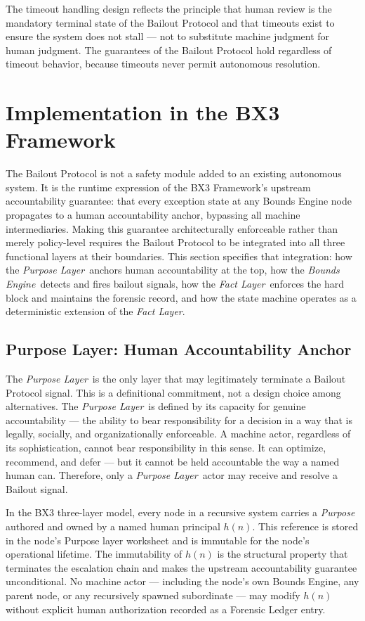 \documentclass[12pt]{article}
\newcommand{\purpose}{\textit{Purpose Layer}}
\newcommand{\bounds}{\textit{Bounds Engine}}
\newcommand{\fact}{\textit{Fact Layer}}
\begin{document}
The timeout handling design reflects the principle that human review is the mandatory terminal state of the Bailout Protocol and that timeouts exist to ensure the system does not stall --- not to substitute machine judgment for human judgment. The guarantees of the Bailout Protocol hold regardless of timeout behavior, because timeouts never permit autonomous resolution.


\section{Implementation in the BX3 Framework}
\label{sec:bailout-implementation}

The Bailout Protocol is not a safety module added to an existing autonomous system. It is the runtime expression of the BX3 Framework's upstream accountability guarantee: that every exception state at any Bounds Engine node propagates to a human accountability anchor, bypassing all machine intermediaries. Making this guarantee architecturally enforceable rather than merely policy-level requires the Bailout Protocol to be integrated into all three functional layers at their boundaries. This section specifies that integration: how the \purpose\ anchors human accountability at the top, how the \bounds\ detects and fires bailout signals, how the \fact\ enforces the hard block and maintains the forensic record, and how the state machine operates as a deterministic extension of the \fact.

\subsection{Purpose Layer: Human Accountability Anchor}
\label{sec:purpose-anchor}

The \purpose\ is the only layer that may legitimately terminate a Bailout Protocol signal. This is a definitional commitment, not a design choice among alternatives. The \purpose\ is defined by its capacity for genuine accountability --- the ability to bear responsibility for a decision in a way that is legally, socially, and organizationally enforceable. A machine actor, regardless of its sophistication, cannot bear responsibility in this sense. It can optimize, recommend, and defer --- but it cannot be held accountable the way a named human can. Therefore, only a \purpose\ actor may receive and resolve a Bailout signal.

In the BX3 three-layer model, every node in a recursive system carries a \textit{Purpose} authored and owned by a named human principal $h(n)$. This reference is stored in the node's Purpose layer worksheet and is immutable for the node's operational lifetime. The immutability of $h(n)$ is the structural property that terminates the escalation chain and makes the upstream accountability guarantee unconditional. No machine actor --- including the node's own Bounds Engine, any parent node, or any recursively spawned subordinate --- may modify $h(n)$ without explicit human authorization recorded as a Forensic Ledger entry.
\end{document}
